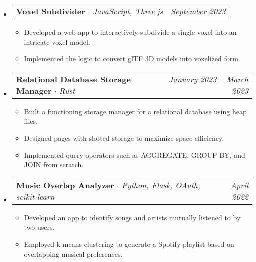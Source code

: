 \documentclass[letterpaper,11pt]{article}
\makeatletter
\newcommand{\resumeItem}[1]{
  \item\small{
    {#1 \vspace{-2pt}}
  }
}
\newcommand{\resumeProjectHeading}[2]{
    \item
    \begin{tabular*}{0.97\textwidth}{l@{\extracolsep{\fill}}r}
      \small#1 & #2 \\
    \end{tabular*}\vspace{-7pt}
}
\newcommand{\resumeSubHeadingListStart}{\begin{itemize}[leftmargin=0.125in, label={}]}
\newcommand{\resumeSubHeadingListEnd}{\end{itemize}}
\newcommand{\resumeItemListStart}{\begin{itemize}[leftmargin=0.25in]
}
\newcommand{\resumeItemListEnd}{\end{itemize}\vspace{-5pt}}
\makeatother
\begin{document}
\resumeSubHeadingListStart
      \resumeProjectHeading
          {\textbf{Voxel Subdivider} $\cdot$ \emph{JavaScript, Three.js}}{\emph{September 2023}}
          \resumeItemListStart
            \resumeItem{Developed a web app to interactively subdivide a single voxel into an intricate voxel model.}
            \resumeItem{Implemented the logic to convert glTF 3D models into voxelized form.}
            \resumeItemListEnd
            
      \resumeProjectHeading
          {\textbf{Relational Database Storage Manager} $\cdot$ \emph{Rust}}{\emph{January 2023 -- March 2023}}
          \resumeItemListStart
             \resumeItem{Built a functioning storage manager for a relational database using heap files.}
        \resumeItem{Designed pages with slotted storage to maximize space efficiency.}
        \resumeItem{Implemented query operators such as AGGREGATE, GROUP BY, and JOIN from scratch.}
          \resumeItemListEnd

    \resumeProjectHeading
          {\textbf{Music Overlap Analyzer} $\cdot$ \emph{Python, Flask, OAuth, scikit-learn}}{\emph{April 2022}}
          \resumeItemListStart
             \resumeItem{Developed an app to identify songs and artists mutually listened to by two users.}
            \resumeItem{Employed k-means clustering to generate a Spotify playlist based on overlapping musical preferences.}
          \resumeItemListEnd
\resumeSubHeadingListEnd

  
\end{document}
